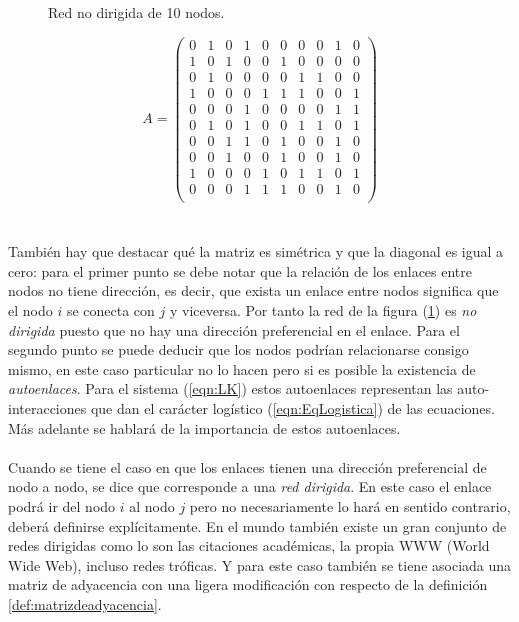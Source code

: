 \begin{figure} \vspace{-30pt} \begin{center}
		 
	\end{center} 
	\vspace{-20pt} 
	\caption{Red no dirigida de 10 nodos.} 
	\vspace{-150pt}
	\label{fig:Red10}
\end{figure} 

$$
A=\begin{pmatrix}
	0 & 1 & 0 & 1 & 0 & 0 & 0 & 0 & 1 & 0 \\
	1 & 0 & 1 & 0 & 0 & 1 & 0 & 0 & 0 & 0 \\
	0 & 1 & 0 & 0 & 0 & 0 & 1 & 1 & 0 & 0 \\
	1 & 0 & 0 & 0 & 1 & 1 & 1 & 0 & 0 & 1 \\
	0 & 0 & 0 & 1 & 0 & 0 & 0 & 0 & 1 & 1 \\
	0 & 1 & 0 & 1 & 0 & 0 & 1 & 1 & 0 & 1 \\
	0 & 0 & 1 & 1 & 0 & 1 & 0 & 0 & 1 & 0 \\
	0 & 0 & 1 & 0 & 0 & 1 & 0 & 0 & 1 & 0 \\
	1 & 0 & 0 & 0 & 1 & 0 & 1 & 1 & 0 & 1 \\
	0 & 0 & 0 & 1 & 1 & 1 & 0 & 0 & 1 & 0 \\
\end{pmatrix}
$$\\
\\
También hay que destacar qué la matriz es simétrica y que la diagonal es igual a cero: para el primer punto se debe notar que la relación de los enlaces entre nodos no tiene dirección, es decir, que exista un enlace entre nodos significa que el nodo $i$ se conecta con $j$ y viceversa. Por tanto la red de la figura (\ref{fig:Red10}) es \textit{no dirigida} puesto que no hay una dirección preferencial en el enlace. Para el segundo punto se puede deducir que los nodos podrían relacionarse consigo mismo, en este caso particular no lo hacen pero si es posible la existencia de \textit{autoenlaces}. Para el sistema (\ref{eqn:LK}) estos autoenlaces representan las auto-interacciones que dan el carácter logístico (\ref{eqn:EqLogistica}) de las ecuaciones. Más adelante se hablará de la importancia de estos autoenlaces.
\\
\\
Cuando se tiene el caso en que los enlaces tienen una dirección preferencial de nodo a nodo, se dice que corresponde a una \textit{red dirigida}. En este caso el enlace podrá ir del nodo $i$ al nodo $j$ pero no necesariamente lo hará en sentido contrario, deberá definirse explícitamente. En el mundo también existe un gran conjunto de redes dirigidas como lo son las citaciones académicas, la propia WWW (World Wide Web), incluso redes tróficas. Y para este caso también se tiene asociada una matriz de adyacencia con una ligera modificación con respecto de la definición \ref{def:matrizdeadyacencia}.
